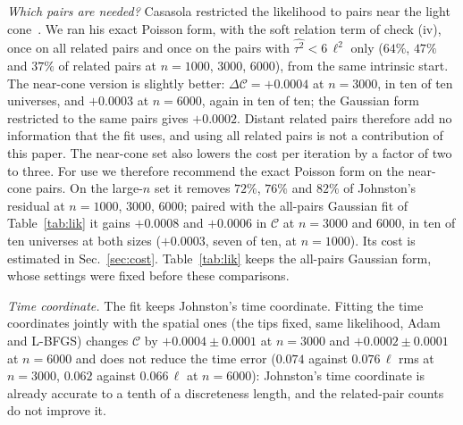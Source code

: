 \documentclass[prd,twocolumn,superscriptaddress,nofootinbib,amsmath,amssymb,floatfix]{revtex4-2}
\begin{document}
\emph{Which pairs are needed?} Casasola restricted the likelihood to pairs near the light cone~\cite{Casasola26}. We ran his exact Poisson form, with the soft relation term of check (iv), once on all related pairs and once on the pairs with $\widehat{\tau^2}<6\,\ell^2$ only ($64\%$, $47\%$ and $37\%$ of related pairs at $n=1000$, $3000$, $6000$), from the same intrinsic start. The near-cone version is slightly better: $\Delta\mathcal C=+0.0004$ at $n=3000$, in ten of ten universes, and $+0.0003$ at $n=6000$, again in ten of ten; the Gaussian form restricted to the same pairs gives $+0.0002$. Distant related pairs therefore add no information that the fit uses, and using all related pairs is not a contribution of this paper. The near-cone set also lowers the cost per iteration by a factor of two to three. For use we therefore recommend the exact Poisson form on the near-cone pairs. On the large-$n$ set it removes $72\%$, $76\%$ and $82\%$ of Johnston's residual at $n=1000$, $3000$, $6000$; paired with the all-pairs Gaussian fit of Table~\ref{tab:lik} it gains $+0.0008$ and $+0.0006$ in $\mathcal C$ at $n=3000$ and $6000$, in ten of ten universes at both sizes ($+0.0003$, seven of ten, at $n=1000$). Its cost is estimated in Sec.~\ref{sec:cost}. Table~\ref{tab:lik} keeps the all-pairs Gaussian form, whose settings were fixed before these comparisons.

\emph{Time coordinate.} The fit keeps Johnston's time coordinate. Fitting the time coordinates jointly with the spatial ones (the tips fixed, same likelihood, Adam and L-BFGS) changes $\mathcal C$ by $+0.0004\pm0.0001$ at $n=3000$ and $+0.0002\pm0.0001$ at $n=6000$ and does not reduce the time error ($0.074$ against $0.076\,\ell$ rms at $n=3000$, $0.062$ against $0.066\,\ell$ at $n=6000$): Johnston's time coordinate is already accurate to a tenth of a discreteness length, and the related-pair counts do not improve it.
\end{document}

